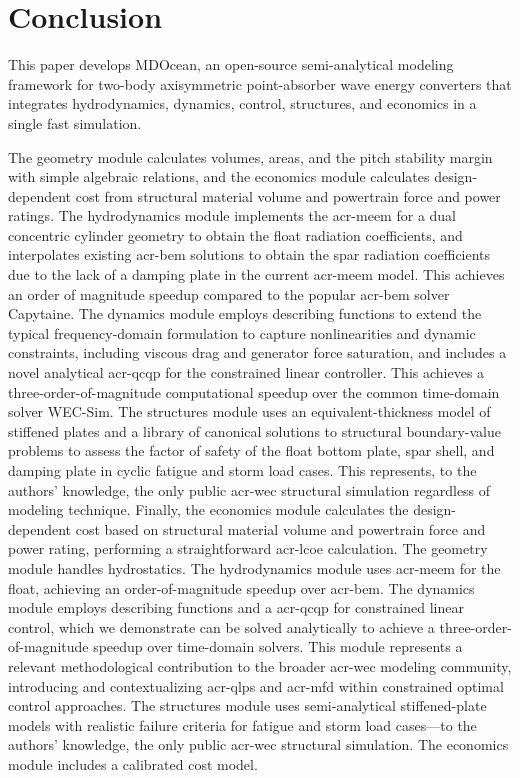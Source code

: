





\section{Conclusion}
This paper develops MDOcean, an open-source semi-analytical modeling framework for two-body axisymmetric point-absorber wave energy converters that integrates hydrodynamics, dynamics, control, structures, and economics in a single fast simulation.

\ifdefined\DISSERTATION
    The geometry module calculates volumes, areas, and the pitch stability margin with simple algebraic relations, and the economics module calculates design-dependent cost from structural material volume and powertrain force and power ratings.
    The hydrodynamics module implements the \gls{acr-meem} for a dual concentric cylinder geometry to obtain the float radiation coefficients, and interpolates existing \gls{acr-bem} solutions to obtain the spar radiation coefficients due to the lack of a damping plate in the current \gls{acr-meem} model.
    This achieves an order of magnitude speedup compared to the popular \gls{acr-bem} solver Capytaine.
    The dynamics module employs describing functions to extend the typical frequency-domain formulation to capture nonlinearities and dynamic constraints, including viscous drag and generator force saturation, and includes a novel analytical \gls{acr-qcqp} for the constrained linear controller.
    This achieves a three-order-of-magnitude computational speedup over the common time-domain solver WEC-Sim.
    The structures module uses an equivalent-thickness model of stiffened plates and a library of canonical solutions to structural boundary-value problems to assess the factor of safety of the float bottom plate, spar shell, and damping plate in cyclic fatigue and storm load cases.
    This represents, to the authors' knowledge, the only public \gls{acr-wec} structural simulation regardless of modeling technique.
    Finally, the economics module calculates the design-dependent cost based on structural material volume and powertrain force and power rating, performing a straightforward \gls{acr-lcoe} calculation.
\else
    The geometry module handles hydrostatics.
    The hydrodynamics module uses \gls{acr-meem} for the float, achieving an order-of-magnitude speedup over \gls{acr-bem}.
    The dynamics module employs describing functions and a \gls{acr-qcqp} for constrained linear control,
    which we demonstrate can be solved analytically to achieve a three-order-of-magnitude speedup over time-domain solvers.
    This module represents a relevant methodological contribution to the broader \gls{acr-wec} modeling community,
    introducing and contextualizing \gls{acr-qlps} and \gls{acr-mfd} within constrained optimal control approaches.
    The structures module uses semi-analytical stiffened-plate models with realistic failure criteria for fatigue and storm load cases---to the authors' knowledge, the only public \gls{acr-wec} structural simulation.
    The economics module includes a calibrated cost model.
\fi

